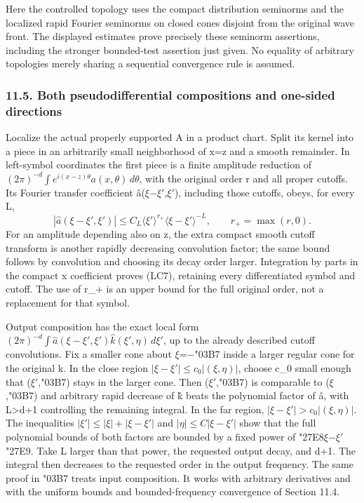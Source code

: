 \documentclass[
  11pt,
]{article}
\begin{document}
Here the controlled topology uses the compact distribution seminorms and
the localized rapid Fourier seminorms on closed cones disjoint from the
original wave front. The displayed estimates prove precisely these
seminorm assertions, including the stronger bounded-test assertion just
given. No equality of arbitrary topologies merely sharing a sequential
convergence rule is assumed.

\subsubsection{11.5. Both pseudodifferential compositions and one-sided
directions}\label{both-pseudodifferential-compositions-and-one-sided-directions}

Localize the actual properly supported A in a product chart. Split its
kernel into a piece in an arbitrarily small neighborhood of x=z and a
smooth remainder. In left-symbol coordinates the first piece is a finite
amplitude reduction of
\((2\pi)^{-d}\int e^{i(x-z)\theta}a(x,\theta)\,d\theta\), with the
original order r and all proper cutoffs. Its Fourier transfer
coefficient â(\ensuremath{\xi}−\ensuremath{\xi}\ensuremath{\prime},\ensuremath{\xi}\ensuremath{\prime}), including those cutoffs, obeys, for every L, \[
|\widehat a(\xi-\xi',\xi')|
 \leq C_L\langle\xi'\rangle^{r_+}
                  \langle\xi-\xi'\rangle^{-L},
\qquad r_+=\max(r,0).
\tag{LC7}
\] For an amplitude depending also on z, the extra compact smooth cutoff
transform is another rapidly decreasing convolution factor; the same
bound follows by convolution and choosing its decay order larger.
Integration by parts in the compact x coefficient proves (LC7),
retaining every differentiated symbol and cutoff. The use of r\_+ is an
upper bound for the full original order, not a replacement for that
symbol.

Output composition has the exact local form
\((2\pi)^{-d}\int\widehat a(\xi-\xi',\xi')\widehat k(\xi',\eta)\,d\xi'\),
up to the already described cutoff convolutions. Fix a smaller cone
about \ensuremath{\xi}=−{\ReaderSymbols\char"03B7} inside a larger regular cone for the original k. In the close
region \(|\xi-\xi'|\leq c_0|(\xi,\eta)|\), choose c\_0 small enough that
(\ensuremath{\xi}\ensuremath{\prime},{\ReaderSymbols\char"03B7}) stays in the larger cone. Then \textbar(\ensuremath{\xi}\ensuremath{\prime},{\ReaderSymbols\char"03B7})\textbar{} is
comparable to \textbar(\ensuremath{\xi},{\ReaderSymbols\char"03B7})\textbar{} and arbitrary rapid decrease of k̂
beats the polynomial factor of â, with L\textgreater d+1 controlling the
remaining integral. In the far region, \(|\xi-\xi'|>c_0|(\xi,\eta)|\).
The inequalities \(|\xi'|\leq|\xi|+|\xi-\xi'|\) and
\(|\eta|\leq C|\xi-\xi'|\) show that the full polynomial bounds of both
factors are bounded by a fixed power of {\ReaderSymbols\char"27E8}\ensuremath{\xi}−\ensuremath{\xi}\ensuremath{\prime}{\ReaderSymbols\char"27E9}. Take L larger than that
power, the requested output decay, and d+1. The integral then decreases
to the requested order in the output frequency. The same proof in {\ReaderSymbols\char"03B7}
treats input composition. It works with arbitrary derivatives and with
the uniform bounds and bounded-frequency convergence of Section 11.4.
\end{document}
